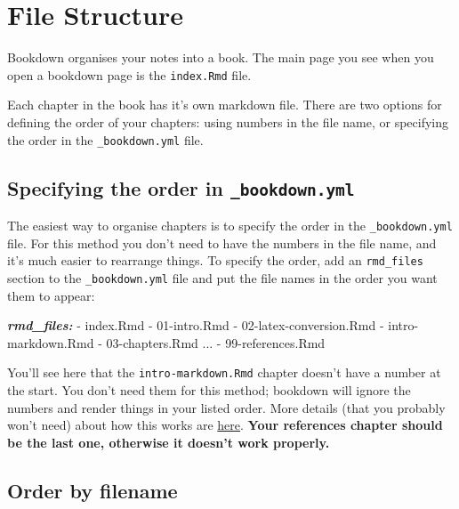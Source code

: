 \documentclass[
]{book}
\newenvironment{Shaded}{\begin{snugshade}}{\end{snugshade}}
\newcommand{\AnnotationTok}[1]{\textcolor[rgb]{0.56,0.35,0.01}{\textbf{\textit{#1}}}}
\newcommand{\NormalTok}[1]{#1}
\newcommand{\SpecialStringTok}[1]{\textcolor[rgb]{0.31,0.60,0.02}{#1}}
\begin{document}
\section{File Structure}\label{sec:file-structure}

Bookdown organises your notes into a book. The main page you see when you open a bookdown page is the \texttt{index.Rmd} file.

Each chapter in the book has it's own markdown file. There are two options for defining the order of your chapters: using numbers in the file name, or specifying the order in the \texttt{\_bookdown.yml} file.

\subsection{\texorpdfstring{Specifying the order in \texttt{\_bookdown.yml}}{Specifying the order in \_bookdown.yml}}\label{sec:specify-order}

The easiest way to organise chapters is to specify the order in the \texttt{\_bookdown.yml} file. For this method you don't need to have the numbers in the file name, and it's much easier to rearrange things. To specify the order, add an \texttt{rmd\_files} section to the \texttt{\_bookdown.yml} file and put the file names in the order you want them to appear:

\begin{Shaded}
\begin{Highlighting}[]
\AnnotationTok{rmd\_files:}
\SpecialStringTok{  {-} }\NormalTok{index.Rmd}
\SpecialStringTok{  {-} }\NormalTok{01{-}intro.Rmd}
\SpecialStringTok{  {-} }\NormalTok{02{-}latex{-}conversion.Rmd}
\SpecialStringTok{  {-} }\NormalTok{intro{-}markdown.Rmd}
\SpecialStringTok{  {-} }\NormalTok{03{-}chapters.Rmd}
\NormalTok{  ...}
\SpecialStringTok{  {-} }\NormalTok{99{-}references.Rmd}
\end{Highlighting}
\end{Shaded}

You'll see here that the \texttt{intro-markdown.Rmd} chapter doesn't have a number at the start. You don't need them for this method; bookdown will ignore the numbers and render things in your listed order. More details (that you probably won't need) about how this works are \href{https://bookdown.org/yihui/bookdown/usage.html}{here}. \textbf{Your references chapter should be the last one, otherwise it doesn't work properly.}

\subsection{Order by filename}\label{sec:order-filename}
\end{document}
